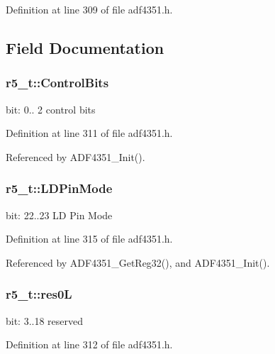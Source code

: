Definition at line 309 of file adf4351.\+h.



\subsection{Field Documentation}
\subsubsection[{\texorpdfstring{Control\+Bits}{ControlBits}}]{ r5\+\_\+t\+::\+Control\+Bits}\hypertarget{structr5__t_aa71c458a3167da85d477b00cf0ae346a}{}\label{structr5__t_aa71c458a3167da85d477b00cf0ae346a}
bit\+: 0.. 2 control bits 

Definition at line 311 of file adf4351.\+h.



Referenced by A\+D\+F4351\+\_\+\+Init().

\subsubsection[{\texorpdfstring{L\+D\+Pin\+Mode}{LDPinMode}}]{ r5\+\_\+t\+::\+L\+D\+Pin\+Mode}\hypertarget{structr5__t_a55135418b639eabcc007205a689dd828}{}\label{structr5__t_a55135418b639eabcc007205a689dd828}
bit\+: 22..23 LD Pin Mode 

Definition at line 315 of file adf4351.\+h.



Referenced by A\+D\+F4351\+\_\+\+Get\+Reg32(), and A\+D\+F4351\+\_\+\+Init().

\subsubsection[{\texorpdfstring{res0L}{res0L}}]{ r5\+\_\+t\+::res0L}\hypertarget{structr5__t_ac295706ea60257469bdd2074f7ec3197}{}\label{structr5__t_ac295706ea60257469bdd2074f7ec3197}
bit\+: 3..18 reserved 

Definition at line 312 of file adf4351.\+h.



